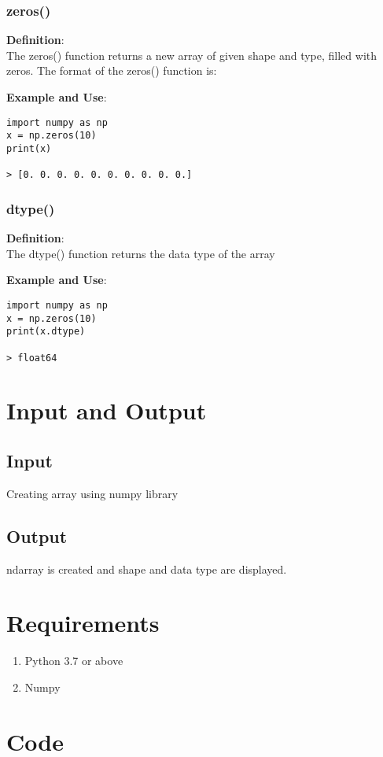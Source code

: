 \documentclass[11pt]{article}
\begin{document}
\subsubsection{zeros()}

\textbf{Definition}:\\
The zeros() function returns a new array of given shape and type, filled with zeros. The format of the zeros() function is:

\textbf{Example and Use}:
\begin{verbatim}
import numpy as np
x = np.zeros(10)
print(x)

> [0. 0. 0. 0. 0. 0. 0. 0. 0. 0.]
\end{verbatim}

\subsubsection{dtype()}

\textbf{Definition}:\\
The dtype() function returns the data type of the array

\textbf{Example and Use}:
\begin{verbatim}
import numpy as np
x = np.zeros(10)
print(x.dtype)
    
> float64
\end{verbatim}

\section{Input and Output}
\subsection{Input}
Creating array using numpy library
\subsection{Output}
ndarray is created and shape and data type are displayed.

\section{Requirements}
\begin{enumerate}
    \item Python 3.7 or above
    \item Numpy
\end{enumerate}

\section{Code}
\end{document}

